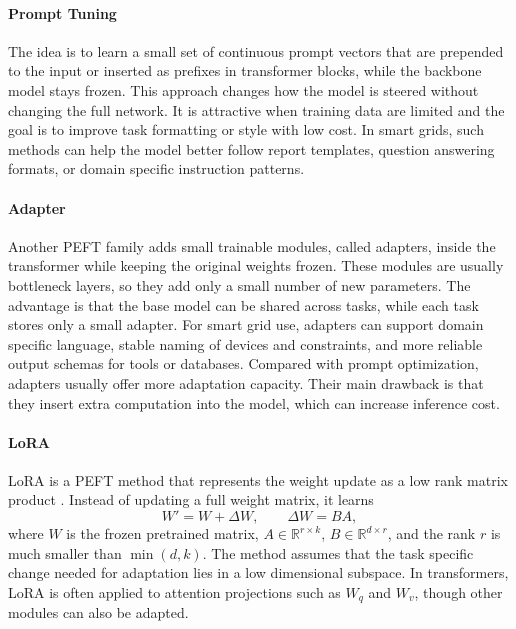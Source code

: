 \documentclass[journal,onecolumn]{IEEEtran} %
\begin{document}
\paragraph{Prompt Tuning} 
The idea is to learn a small set of continuous prompt vectors that are prepended to the input or inserted as prefixes in transformer blocks, while the backbone model stays frozen. This approach changes how the model is steered without changing the full network. It is attractive when training data are limited and the goal is to improve task formatting or style with low cost. In smart grids, such methods can help the model better follow report templates, question answering formats, or domain specific instruction patterns.

\paragraph{Adapter}
Another PEFT family adds small trainable modules, called adapters, inside the transformer while keeping the original weights frozen. These modules are usually bottleneck layers, so they add only a small number of new parameters. The advantage is that the base model can be shared across tasks, while each task stores only a small adapter. For smart grid use, adapters can support domain specific language, stable naming of devices and constraints, and more reliable output schemas for tools or databases. Compared with prompt optimization, adapters usually offer more adaptation capacity. Their main drawback is that they insert extra computation into the model, which can increase inference cost.

\paragraph{LoRA}
LoRA is a PEFT method that represents the weight update as a low rank matrix product \cite{hu2021lora}. Instead of updating a full weight matrix, it learns
\begin{equation}
W' = W + \Delta W,\qquad \Delta W = BA,
\end{equation}
where $W$ is the frozen pretrained matrix, $A \in \mathbb{R}^{r \times k}$, $B \in \mathbb{R}^{d \times r}$, and the rank $r$ is much smaller than $\min(d,k)$. The method assumes that the task specific change needed for adaptation lies in a low dimensional subspace. In transformers, LoRA is often applied to attention projections such as $W_q$ and $W_v$, though other modules can also be adapted.
\end{document}
